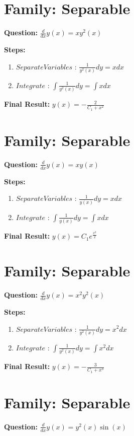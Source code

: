\documentclass{article}
\begin{document}
\section*{Family: Separable}
\textbf{Question:} $\frac{d}{d x} y{\left(x \right)} = x y^{2}{\left(x \right)}$

\textbf{Steps:}
\begin{enumerate}
\item $Separate Variables$ :  $\frac{1}{y^{2}{\left(x \right)}} dy = x dx$
\item $Integrate$ :  $\int \frac{1}{y^{2}{\left(x \right)}} dy = \int x dx$
\end{enumerate}
\textbf{Final Result:} $y{\left(x \right)} = - \frac{2}{C_{1} + x^{2}}$

\section*{Family: Separable}
\textbf{Question:} $\frac{d}{d x} y{\left(x \right)} = x y{\left(x \right)}$

\textbf{Steps:}
\begin{enumerate}
\item $Separate Variables$ :  $\frac{1}{y{\left(x \right)}} dy = x dx$
\item $Integrate$ :  $\int \frac{1}{y{\left(x \right)}} dy = \int x dx$
\end{enumerate}
\textbf{Final Result:} $y{\left(x \right)} = C_{1} e^{\frac{x^{2}}{2}}$

\section*{Family: Separable}
\textbf{Question:} $\frac{d}{d x} y{\left(x \right)} = x^{2} y^{2}{\left(x \right)}$

\textbf{Steps:}
\begin{enumerate}
\item $Separate Variables$ :  $\frac{1}{y^{2}{\left(x \right)}} dy = x^{2} dx$
\item $Integrate$ :  $\int \frac{1}{y^{2}{\left(x \right)}} dy = \int x^{2} dx$
\end{enumerate}
\textbf{Final Result:} $y{\left(x \right)} = - \frac{3}{C_{1} + x^{3}}$

\section*{Family: Separable}
\textbf{Question:} $\frac{d}{d x} y{\left(x \right)} = y^{2}{\left(x \right)} \sin{\left(x \right)}$
\end{document}
